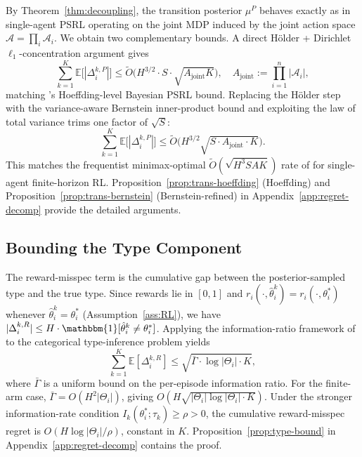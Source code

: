 \documentclass{article}
\begin{document}
By Theorem~\ref{thm:decoupling}, the transition posterior $\mu^P$ behaves exactly as in single-agent PSRL operating on the joint MDP induced by the joint action space $\mathcal{A} = \prod_i \mathcal{A}_i$. We obtain two complementary bounds. A direct Hölder + Dirichlet $\ell_1$-concentration argument gives
\begin{equation}
\sum_{k=1}^K \mathbb{E}\big[|\Delta_i^{k,P}|\big] \leq \tilde{O}\Big(H^{3/2} \cdot S \cdot \sqrt{A_{\mathrm{joint}} K}\Big), \quad A_{\mathrm{joint}} := \prod_{i=1}^n |\mathcal{A}_i|,
\end{equation}
matching \citet{osband2013more}'s Hoeffding-level Bayesian PSRL bound. Replacing the Hölder step with the variance-aware Bernstein inner-product bound \citep{azar2017minimax,lu2019information} and exploiting the law of total variance trims one factor of $\sqrt{S}$:
\begin{equation}
\sum_{k=1}^K \mathbb{E}\big[|\Delta_i^{k,P}|\big] \leq \tilde{O}\Big(H^{3/2}\sqrt{S \cdot A_{\mathrm{joint}} \cdot K}\Big).
\end{equation}
This matches the frequentist minimax-optimal $\tilde{O}(\sqrt{H^3SAK})$ rate of \citet{azar2017minimax} for single-agent finite-horizon RL. Proposition~\ref{prop:trans-hoeffding} (Hoeffding) and Proposition~\ref{prop:trans-bernstein} (Bernstein-refined) in Appendix~\ref{app:regret-decomp} provide the detailed arguments.

\subsection{Bounding the Type Component}

The reward-misspec term is the cumulative gap between the posterior-sampled type and the true type. Since rewards lie in $[0, 1]$ and $r_i(\cdot, \hat{\theta}_i^k) = r_i(\cdot, \theta_i^*)$ whenever $\hat{\theta}_i^k = \theta_i^*$ (Assumption~\ref{ass:RL}), we have $|\Delta_i^{k,R}| \leq H \cdot \mathbbm{1}[\hat{\theta}_i^k \neq \theta_i^*]$. Applying the information-ratio framework of \citet{russo2016information} to the categorical type-inference problem yields
\begin{equation}
\sum_{k=1}^K \mathbb{E}[\Delta_i^{k,R}] \leq \sqrt{\bar{\Gamma} \cdot \log|\Theta_i| \cdot K},
\end{equation}
where $\bar{\Gamma}$ is a uniform bound on the per-episode information ratio. For the finite-arm case, $\bar{\Gamma} = O(H^2 |\Theta_i|)$, giving $O(H\sqrt{|\Theta_i| \log|\Theta_i| \cdot K})$. Under the stronger information-rate condition $I_k(\theta_i^*; \tau_k) \geq \rho > 0$, the cumulative reward-misspec regret is $O(H \log|\Theta_i| / \rho)$, constant in $K$. Proposition~\ref{prop:type-bound} in Appendix~\ref{app:regret-decomp} contains the proof.
\end{document}
